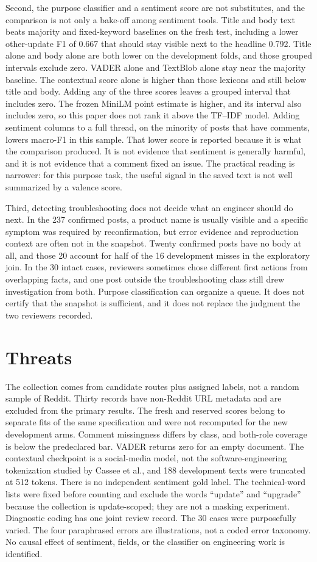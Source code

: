 \documentclass[conference,letterpaper]{IEEEtran}
\begin{document}
Second, the purpose classifier and a sentiment score are not substitutes, and the comparison is not only a bake-off among sentiment tools. Title and body text beats majority and fixed-keyword baselines on the fresh test, including a lower other-update F1 of 0.667 that should stay visible next to the headline 0.792. Title alone and body alone are both lower on the development folds, and those grouped intervals exclude zero. VADER alone and TextBlob alone stay near the majority baseline. The contextual score alone is higher than those lexicons and still below title and body. Adding any of the three scores leaves a grouped interval that includes zero. The frozen MiniLM point estimate is higher, and its interval also includes zero, so this paper does not rank it above the TF--IDF model. Adding sentiment columns to a full thread, on the minority of posts that have comments, lowers macro-F1 in this sample. That lower score is reported because it is what the comparison produced. It is not evidence that sentiment is generally harmful, and it is not evidence that a comment fixed an issue. The practical reading is narrower: for this purpose task, the useful signal in the saved text is not well summarized by a valence score.

Third, detecting troubleshooting does not decide what an engineer should do next. In the 237 confirmed posts, a product name is usually visible and a specific symptom was required by reconfirmation, but error evidence and reproduction context are often not in the snapshot. Twenty confirmed posts have no body at all, and those 20 account for half of the 16 development misses in the exploratory join. In the 30 intact cases, reviewers sometimes chose different first actions from overlapping facts, and one post outside the troubleshooting class still drew investigation from both. Purpose classification can organize a queue. It does not certify that the snapshot is sufficient, and it does not replace the judgment the two reviewers recorded.

\section{Threats}
The collection comes from candidate routes plus assigned labels, not a random sample of Reddit. Thirty records have non-Reddit URL metadata and are excluded from the primary results. The fresh and reserved scores belong to separate fits of the same specification and were not recomputed for the new development arms. Comment missingness differs by class, and both-role coverage is below the predeclared bar. VADER returns zero for an empty document. The contextual checkpoint is a social-media model, not the software-engineering tokenization studied by Cassee et al., and 188 development texts were truncated at 512 tokens. There is no independent sentiment gold label. The technical-word lists were fixed before counting and exclude the words ``update'' and ``upgrade'' because the collection is update-scoped; they are not a masking experiment. Diagnostic coding has one joint review record. The 30 cases were purposefully varied. The four paraphrased errors are illustrations, not a coded error taxonomy. No causal effect of sentiment, fields, or the classifier on engineering work is identified.
\end{document}

